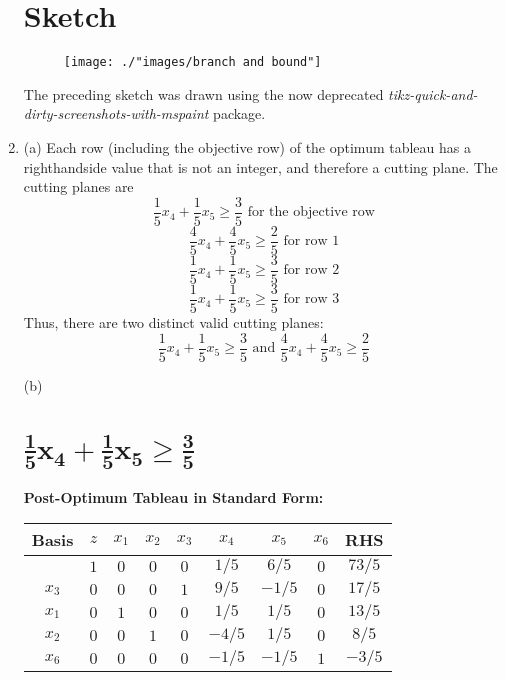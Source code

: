 \documentclass{article}[12pt,a4paper]
\begin{document}
\begin{enumerate}
  	   \noindent \section*{Sketch}
  	   \begin{figure}[!htb]
    		\centering
    		\texttt{[image: ./"images/branch and bound"]}
  	  \end{figure}
  	  \noindent The preceding sketch was drawn using the now deprecated 
  	  \textit{tikz-quick-and-dirty-screenshots-with-mspaint} package.
  	  
  	  \pagebreak
  	  
  	  \item
  	  (a) Each row (including the objective row) of the optimum tableau has a righthandside value that is not an integer,
  	  and therefore a cutting plane. The cutting planes are
  	  $$\frac{1}{5}x_4 + \frac{1}{5}x_5 \ge \frac{3}{5} \mbox{ for the objective row}$$
  	  $$\frac{4}{5}x_4 + \frac{4}{5}x_5 \ge \frac{2}{5}\mbox{ for row } 1$$
  	  $$\frac{1}{5}x_4 + \frac{1}{5}x_5 \ge \frac{3}{5} \mbox{ for row } 2$$
  	  $$\frac{1}{5}x_4 + \frac{1}{5}x_5 \ge \frac{3}{5} \mbox{ for row } 3$$
  	  Thus, there are two distinct valid cutting planes:
  	  $$\frac{1}{5}x_4 + \frac{1}{5}x_5 \ge \frac{3}{5} \mbox{ and } \frac{4}{5}x_4 + \frac{4}{5}x_5 \ge \frac{2}{5}$$
  	  
  	  \noindent (b)
  	  
  	  \section*{$\mathbf{\frac{1}{5}x_4 + \frac{1}{5}x_5 \ge \frac{3}{5}}$}
  	  
  	  \textbf{Post-Optimum Tableau in Standard Form:}
  	  \begin{center}
 	   \begin{tabular}{c | c | c c c c c c | c}
            		Basis & $z$ & $x_1$ & $x_2$ & $x_3$ & $x_4$ & $x_5$ & $x_6$ & RHS \\ \hline
  			           & $1$ & $0$ & $0$   & $0$ & $1/5$     & $6/5$ & $0$ & $73/5$  \\ \hline
  			$x_3$ & $0$ & $0$ & $0$   & $1$    & $9/5$  & $-1/5$ & $0$ & $17/5$ \\
  			$x_1$ & $0$ & $1$ & $0$  &  $0$    & $1/5$  & $1/5$ & $0$ & $13/5$ \\
  			$x_2$ & $0$ & $0$ & $1$ &   $0$    & $-4/5$ & $1/5$ & $0$ & $8/5$ \\
  			$x_6$ & $0$ & $0$ & $0$ &   $0$    & $-1/5$ & $-1/5$ & $1$ & $-3/5$ \\
  	  \end{tabular}
  	  \end{center}
  	  

\end{enumerate}
\end{document}
